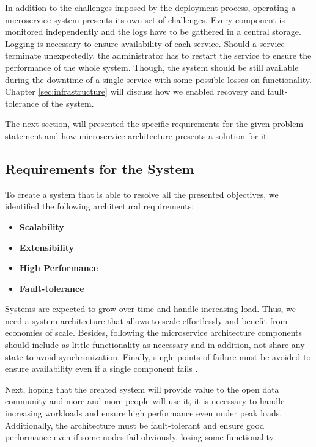 In addition to the challenges imposed by the deployment process,
operating a microservice system presents its own set of challenges.
Every component is monitored independently and the logs have to be
gathered in a central storage. Logging is necessary to ensure
availability of each service. Should a service terminate unexpectedly,
the administrator has to restart the service to ensure the performance
of the whole system. Though, the system should be still available during
the downtime of a single service with some possible losses on
functionality. Chapter \ref{sec:infrastructure} will discuss how
we enabled recovery and fault-tolerance of the system.

The next section, will presented the specific requirements for the given
problem statement and how microservice architecture presents a solution
for it.

\subsection{Requirements for the System}\label{requirements-of-the-whole-platform}

To create a system that is able to resolve all the presented objectives,
we identified the following architectural requirements:

\begin{itemize}
\tightlist
\item
  \textbf{Scalability}
\item
  \textbf{Extensibility}
\item
  \textbf{High Performance}
\item
  \textbf{Fault-tolerance}
\end{itemize}

Systems are expected to grow over time and handle increasing load. Thus,
we need a system architecture that allows to scale effortlessly and
benefit from economies of scale. Besides, following the microservice
architecture components should include as little functionality as
necessary and in addition, not share any state to avoid synchronization.
Finally, single-points-of-failure must be avoided to ensure availability
even if a single component fails \cite{Chatzakis.2016}.

Next, hoping that the created system will provide value to the open data
community and more and more people will use it, it is necessary to
handle increasing workloads and ensure high performance even under peak
loads. Additionally, the architecture must be fault-tolerant and ensure
good performance even if some nodes fail obviously, losing some
functionality.

